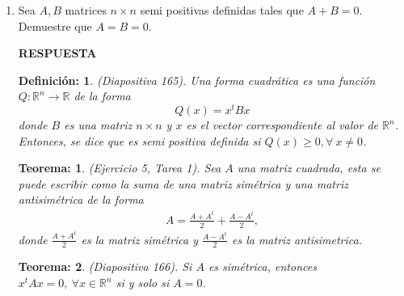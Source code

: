 \documentclass[11pt,letterpaper]{article}
\newcommand{\mR}{\mathbb{R}}
\newcommand{\res}{\textbf{RESPUESTA}\\}
\newtheorem{thmt}{Teorema:}
\newtheorem{thmd}{Definición:}
\begin{document}
\begin{enumerate}
\item Sea $A,B$ matrices $n\times n$ semi positivas definidas tales que $A+B=0.$ Demuestre que $A=B=0$.

\res \begin{framed}
    \begin{thmd} \label{d_fomma_cuadratica}
	(Diapositiva 165). Una forma cuadrática es una función $Q:\mR^n \rightarrow \mR$ de la forma 
	$$Q(x)=x^tBx$$
	donde $B$ es una matriz $n\times n$ y $x$ es el vector correspondiente al valor de $\mR^n$.\\
	Entonces, se dice que es semi positiva definida si $Q(x)\geq 0, \forall \ x\neq 0$.
	    \end{thmd}
\end{framed}
\begin{framed}
    \begin{thmt} \label{t_ejercicio5}
	(Ejercicio 5, Tarea 1). Sea $A$ una matriz cuadrada, esta se puede escribir como la suma de una matriz simétrica y una matriz antisimétrica de la forma 
	\begin{align*}
	A= \frac{A+A^t}{2}+\frac{A-A^t}{2},
	\end{align*}
	donde $\frac{A+A^t}{2}$ es la matriz simétrica y $\frac{A-A^t}{2}$ es la matriz antisimetrica. 
	    \end{thmt}
\end{framed}
\begin{framed}
    \begin{thmt} \label{t_simetrica_nula}
	(Diapositiva 166). Si $A$ es simétrica, entonces $x^tAx=0,\ \forall x\in \mR^n$ si y solo si $A=0$. 
	    \end{thmt}
\end{framed}


\end{enumerate}
\end{document}

